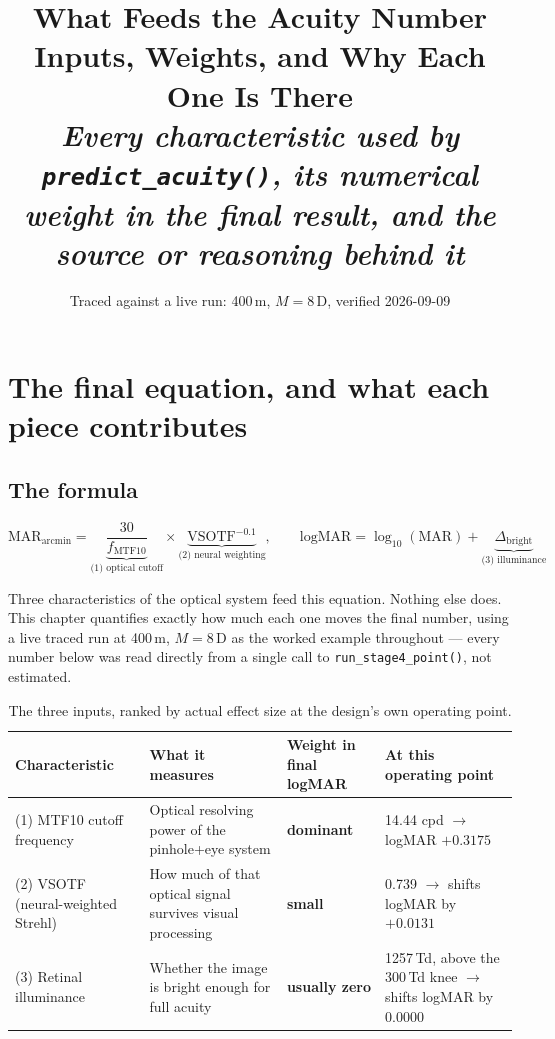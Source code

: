 \documentclass[11pt]{report}
\title{\textbf{\Huge What Feeds the Acuity Number}\\[0.3cm]
\textcolor{hbblue}{\huge Inputs, Weights, and Why Each One Is There}\\[0.5cm]
\large\itshape Every characteristic used by \texttt{predict\_acuity()}, its numerical
weight in the final result, and the source or reasoning behind it}
\author{}
\date{Traced against a live run: 400\,\textmu m, $M=8$\,D, verified 2026-09-09}
\begin{document}
\maketitle
\tableofcontents

\chapter{The final equation, and what each piece contributes}

\section{The formula}

\begin{equation}
\text{MAR}_{\text{arcmin}} = \underbrace{\frac{30}{f_{\text{MTF10}}}}_{\text{(1) optical cutoff}}
\times \underbrace{\text{VSOTF}^{-0.1}}_{\text{(2) neural weighting}},
\qquad
\text{logMAR} = \log_{10}(\text{MAR}) + \underbrace{\Delta_{\text{bright}}}_{\text{(3) illuminance}}
\end{equation}

Three characteristics of the optical system feed this equation. Nothing else does. This chapter
quantifies exactly how much each one moves the final number, using a live traced run at
400\,\textmu m, $M=8$\,D as the worked example throughout --- every number below was read directly
from a single call to \texttt{run\_stage4\_point()}, not estimated.

\begin{table}[h!]
\centering
\begin{tabular}{p{3.7cm}p{4.2cm}p{2.0cm}p{4.0cm}}
\toprule
\textbf{Characteristic} & \textbf{What it measures} & \textbf{Weight in final logMAR} &
\textbf{At this operating point} \\
\midrule
(1) MTF10 cutoff frequency & Optical resolving power of the pinhole+eye system & \textbf{dominant} &
14.44 cpd $\to$ logMAR $+0.3175$ \\
(2) VSOTF (neural-weighted Strehl) & How much of that optical signal survives visual processing &
\textbf{small} & 0.739 $\to$ shifts logMAR by $+0.0131$ \\
(3) Retinal illuminance & Whether the image is bright enough for full acuity & \textbf{usually zero}
& 1257\,Td, above the 300\,Td knee $\to$ shifts logMAR by $0.0000$ \\
\bottomrule
\end{tabular}
\caption{The three inputs, ranked by actual effect size at the design's own operating point.}
\end{table}
\end{document}
